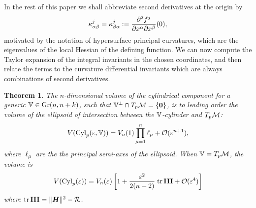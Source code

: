 \documentclass[letterpaper, reqno, 11pt]{amsart}
\newtheorem{theorem}{Theorem}[section]
\theoremstyle{definition}
\theoremstyle{remark}
\numberwithin{equation}{section}
\begin{document}
 In the rest of this paper we shall abbreviate second derivatives at the origin by
$$
\kappa^j_{\alpha\beta}= \kappa^j_{\beta\alpha} :=\frac{\partial^2 f^j}{\partial x^\alpha\partial x^\beta}(0) ,
$$
motivated by the notation of hypersurface principal curvatures, which are the eigenvalues of the local Hessian of the defining function.
We can now compute the Taylor expansion of the integral invariants in the chosen coordinates, and then relate the terms to the curvature differential invariants which are always combinations of second derivatives.

\begin{theorem}\label{th:volCyl}
	The $n$-dimensional volume of the cylindrical component for a generic $\mathbb{V}\in\mathrm{Gr}({n},{n+k})$, such that $\mathbb{V}^\perp\cap T_p{\mathcal M}=\{\boldsymbol{0}\}$, is to leading order the volume of the ellipsoid of intersection between the $\mathbb{V}$-cylinder and $T_p{\mathcal M}$:
\begin{equation}
	V(\mathrm{Cyl}_p(\varepsilon,\mathbb{V})) = V_n(1)\prod_{\mu=1}^n \ell_\mu +{\mathcal O}(\varepsilon^{n+1}),
\end{equation}
where $\ell_\mu$ are the the \emph{principal semi-axes} of the ellipsoid. When $\mathbb{V}=T_p{\mathcal M}$, the volume is
\begin{equation}\label{eq:volCyl}
	V(\mathrm{Cyl}_p(\varepsilon)) = V_n(\varepsilon)\left[ 1+\frac{\varepsilon^2}{2(n+2)}\;\mathrm{tr}\,\boldsymbol{\mathrm{III}} +{\mathcal O}(\varepsilon^4) \right]
\end{equation}
where $\mathrm{tr}\,\boldsymbol{\mathrm{III}}=\|\boldsymbol{H}\|^2-\mathcal{R}$.
\end{theorem}
\end{document}
